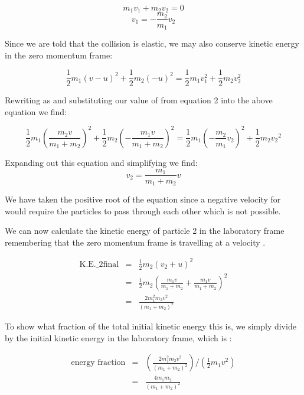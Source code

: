 \begin{problem}
{\begin{equation*}
m_1 v_1 + m_2 v_2 = 0
\end{equation*}
\begin{equation}
v_1=-\frac{m_2}{m_1} v_2
\end{equation}

Since we are told that the collision is elastic, we may also conserve kinetic energy in the zero momentum frame:

\begin{equation*}
\frac{1}{2}m_1 (v-u)^2+\frac{1}{2}m_2(-u)^2 = \frac{1}{2}m_1 v_1^2+\frac{1}{2}m_2 v_2^2
\end{equation*}

Rewriting  as  and substituting our value of  from equation 2 into the above equation we find:

\begin{equation*}
\frac{1}{2}m_1 \left(\frac{m_2 v}{m_1 + m_2}\right)^2+\frac{1}{2}m_2\left(-\frac{m_1 v}{m_1 + m_2}\right)^2 = \frac{1}{2}m_1\left(-\frac{m_2}{m_1}v_2\right)^2+\frac{1}{2} m_2{v_2}^2
\end{equation*}

Expanding out this equation and simplifying we find:
\begin{equation*}
v_2 = \frac{m_1}{m_1 + m_2}v
\end{equation*}

We have taken the positive root of the equation since a negative velocity for  would require the particles to pass through each other which is not possible. 

We can now calculate the kinetic energy of particle 2 in the laboratory frame remembering that the zero momentum frame is travelling at a velocity .

\begin{eqnarray*}
\text{K.E._{2final}} &=& \frac{1}{2}m_2\left(v_2 + u\right)^2 \\
 &=& \frac{1}{2}m_2\left(\frac{m_1v}{m_1 + m_2}+ \frac{m_1 v}{m_1 + m_2}\right)^2 \\
 &=& \frac{2 m_1^2 m_2 v^2}{\left(m_1 + m_2\right)^2}
\end{eqnarray*}

To show what fraction of the total initial kinetic energy this is, we simply divide by the initial kinetic energy in the laboratory frame, which is :

\begin{eqnarray}
\text{energy fraction} &=& \left(\frac{2 m_1^2 m_2 v^2}{\left(m_1 + m_2\right)^2}\right)/\left(\frac{1}{2}m_1v^2\right) \nonumber \\
&=& \frac{4m_{1}m_{2}}{(m_{1}+m_{2})^{2}}
\end{eqnarray}

}
\end{problem}

